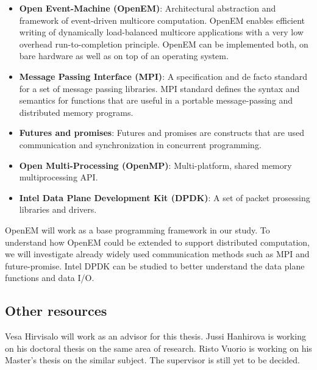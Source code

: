 \begin{itemize}

\item \textbf{Open Event-Machine (OpenEM)}: Architectural abstraction and framework of event-driven multicore computation. OpenEM enables efficient writing of dynamically load-balanced multicore applications with a very low overhead run-to-completion principle. OpenEM can be implemented both, on bare hardware as well as on top of an operating system.
\item \textbf{Message Passing Interface (MPI)}: A specification and de facto standard for a set of message passing libraries. MPI standard defines the syntax and semantics for functions that are useful in a portable message-passing and distributed memory programs.
\item \textbf{Futures and promises}: Futures and promises are constructs that are used communication and synchronization in concurrent programming.
\item \textbf{Open Multi-Processing (OpenMP)}: Multi-platform, shared memory multiprocessing API.
\item \textbf{Intel Data Plane Development Kit (DPDK)}: A set of packet prosessing libraries and drivers.
\end{itemize}

OpenEM will work as a base programming framework in our study. To understand how OpenEM could be extended to support distributed computation, we will investigate already widely used communication methods such as MPI and future-promise. Intel DPDK can be studied to better understand the data plane functions and data I/O.

\subsection{Other resources}
Vesa Hirvisalo will work as an advisor for this thesis. Jussi Hanhirova is working on his doctoral thesis on the same area of research. Risto Vuorio is working on his Master's thesis on the similar subject. The supervisor is still yet to be decided.


